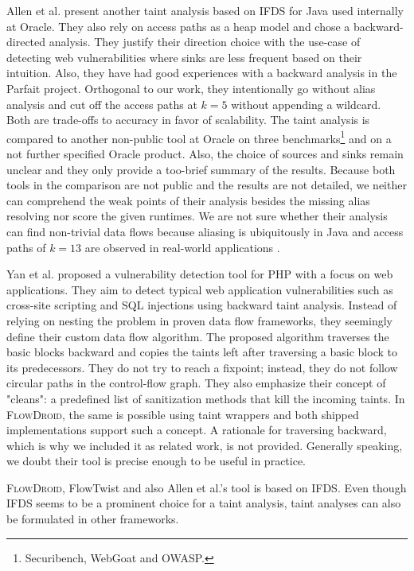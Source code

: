 \documentclass[../draft.tex]{subfiles}
\begin{document}
    Allen et al.\cite{Allen2021} present another taint analysis based on IFDS for Java used internally at Oracle.
    They also rely on access paths as a heap model and chose a backward-directed analysis.
    They justify their direction choice with the use-case of detecting web vulnerabilities where sinks are less frequent based on their intuition.
    Also, they have had good experiences with a backward analysis in the Parfait\cite{Winter2013} project.
    Orthogonal to our work, they intentionally go without alias analysis and cut off the access paths at $k=5$ without appending a wildcard.
    Both are trade-offs to accuracy in favor of scalability.
    The taint analysis is compared to another non-public tool at Oracle on three benchmarks\footnote{Securibench, WebGoat and OWASP.} and on a not further specified Oracle product.
    Also, the choice of sources and sinks remain unclear and they only provide a too-brief summary of the results.
    Because both tools in the comparison are not public and the results are not detailed, we neither can comprehend the weak points of their analysis besides the missing alias resolving nor score the given runtimes.
    We are not sure whether their analysis can find non-trivial data flows because aliasing is ubiquitously in Java and access paths of $k=13$ are observed in real-world applications \cite{Spaeth2019}.

    Yan et al.\cite{Yan2017} proposed a vulnerability detection tool for PHP with a focus on web applications.
    They aim to detect typical web application vulnerabilities such as cross-site scripting and SQL injections using backward taint analysis.
    Instead of relying on nesting the problem in proven data flow frameworks, they seemingly define their custom data flow algorithm.
    The proposed algorithm traverses the basic blocks backward and copies the taints left after traversing a basic block to its predecessors.
    They do not try to reach a fixpoint; instead, they do not follow circular paths in the control-flow graph.
    They also emphasize their concept of "cleans": a predefined list of sanitization methods that kill the incoming taints.
    In \textsc{FlowDroid}, the same is possible using taint wrappers and both shipped implementations support such a concept.
    A rationale for traversing backward, which is why we included it as related work, is not provided.
    Generally speaking, we doubt their tool is precise enough to be useful in practice.

    \textsc{FlowDroid}, FlowTwist and also Allen et al.'s tool is based on IFDS.
    Even though IFDS seems to be a prominent choice for a taint analysis, taint analyses can also be formulated in other frameworks.
\end{document}
